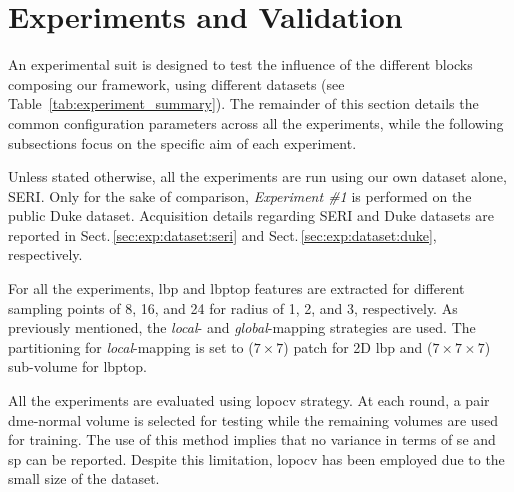  \graphicspath{ {./content/experiment/figures/} }

\section{Experiments and Validation}
\label{sec:exp} \label{sec:exp:datasets}
An experimental suit is designed to test the influence of the different blocks composing our framework, using different datasets (see Table~\ref{tab:experiment_summary}).
The remainder of this section details the common configuration parameters across all the experiments, while the following subsections focus on the specific aim of each experiment.

Unless stated otherwise, all the experiments are run using our own dataset alone, SERI.
Only for the sake of comparison, \emph{Experiment \#1} is performed on the public Duke dataset.
Acquisition details regarding SERI and Duke datasets are reported in Sect.\,\ref{sec:exp:dataset:seri} and Sect.\,\ref{sec:exp:dataset:duke}, respectively.

For all the experiments, \ac{lbp} and \ac{lbptop} features are extracted for different sampling points of 8, 16, and 24 for radius of 1, 2, and 3, respectively.
As previously mentioned, the \emph{local}- and \emph{global}-mapping strategies are used.
The partitioning for \emph{local}-mapping is set to ($7 \times 7$) patch for 2D \ac{lbp} and ($ 7 \times 7 \times 7$) sub-volume for \ac{lbptop}.

All the experiments are evaluated using \ac{lopocv} strategy.
At each round, a pair \ac{dme}-normal volume is selected for testing while the remaining volumes are used for training.
The use of this method implies that no variance in terms of \acf{se} and \acf{sp} can be reported.
Despite this limitation, \ac{lopocv} has been employed due to the small size of the dataset.


